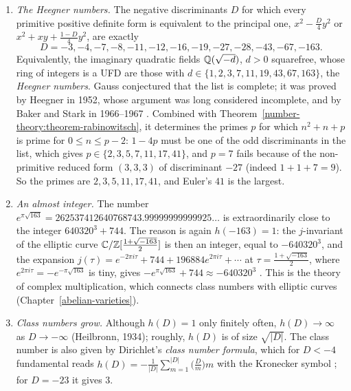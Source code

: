 \begin{remark}\label{number-theory:remark-heegner}
\begin{enumerate}
\item \emph{The Heegner numbers.} The negative discriminants $D$ for which every primitive positive definite form is equivalent to the principal one, $x^2 - \frac D4y^2$ or $x^2 + xy + \frac{1 - D}4y^2$,
are exactly
\[
D = -3, -4, -7, -8, -11, -12, -16, -19, -27, -28, -43, -67, -163 .
\]
Equivalently, the imaginary quadratic fields $\mathbb{Q}(\sqrt{-d})$, $d > 0$ squarefree, whose ring of integers is a UFD are those with $d \in \{1, 2, 3, 7, 11, 19, 43, 67, 163\}$, the \emph{Heegner numbers}. Gauss
conjectured that the list is complete; it was proved by Heegner in 1952, whose argument was long considered incomplete, and by Baker and Stark in 1966--1967 \cite{cox-primes}. Combined with
Theorem~\ref{number-theory:theorem-rabinowitsch}, it determines the primes $p$ for which $n^2 + n + p$ is prime for $0 \leq n \leq p - 2$: $1 - 4p$ must be one of the odd discriminants in the list, which gives
$p \in \{2, 3, 5, 7, 11, 17, 41\}$, and $p = 7$ fails because of the non-primitive reduced form $(3, 3, 3)$ of discriminant $-27$ (indeed $1 + 1 + 7 = 9$). So the primes are $2, 3, 5, 11, 17, 41$, and Euler's
$41$ is the largest.
\item \emph{An almost integer.} The number $e^{\pi\sqrt{163}} = 262537412640768743.99999999999925\ldots$ is extraordinarily close to the integer $640320^3 + 744$. The reason is again $h(-163) = 1$: the
$j$-invariant of the elliptic curve $\mathbb{C}/\mathbb{Z}[\frac{1 + \sqrt{-163}}{2}]$ is then an integer, equal to $-640320^3$, and the expansion $j(\tau) = e^{-2\pi i\tau} + 744 + 196884e^{2\pi i\tau} + \cdots$ at
$\tau = \frac{1 + \sqrt{-163}}{2}$, where $e^{2\pi i\tau} = -e^{-\pi\sqrt{163}}$ is tiny, gives $-e^{\pi\sqrt{163}} + 744 \approx -640320^3$ \cite{cox-primes}. This is the theory of complex
multiplication, which connects class numbers with elliptic curves (Chapter~\ref{abelian-varieties}).
\item \emph{Class numbers grow.} Although $h(D) = 1$ only finitely often, $h(D) \to \infty$ as $D \to -\infty$ (Heilbronn, 1934); roughly, $h(D)$ is of size $\sqrt{|D|}$. The class number is also given
by Dirichlet's \emph{class number formula}, which for $D < -4$ fundamental reads $h(D) = -\frac1{|D|}\sum_{m=1}^{|D|}\bigl(\frac{D}{m}\bigr)m$ with the Kronecker symbol \cite{cox-primes}; for $D = -23$ it
gives $3$.
\end{enumerate}
\end{remark}

